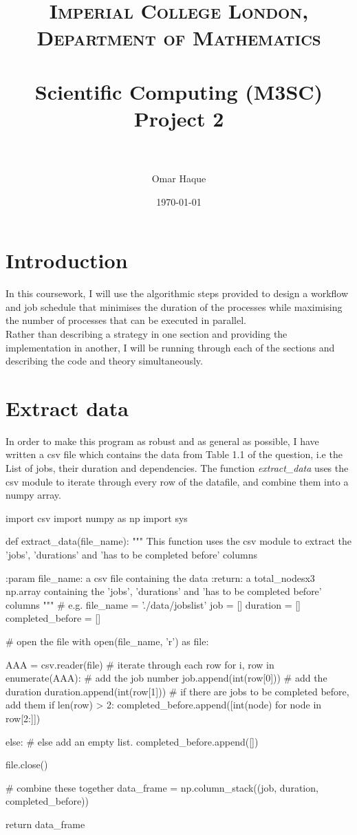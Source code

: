 \documentclass[paper=a4, fontsize=12pt]{scrartcl} %
\title{
\normalfont \normalsize
\textsc{Imperial College London, Department of Mathematics} \\ [25pt]
\horrule{0.5pt} \\[0.4cm]                      %
\huge Scientific Computing (M3SC) Project 2 \\           %
\horrule{2pt} \\[0.5cm]                        %
}
\author{Omar Haque}
\date{\normalsize\today}
\numberwithin{equation}{section}       %
\numberwithin{figure}{section}         %
\numberwithin{table}{section}          %
\begin{document}

\maketitle

\section{Introduction}

In this coursework, I will use the algorithmic steps provided to design a workflow and job schedule that minimises the duration of the processes while maximising the number of processes that can be executed in parallel. \\
Rather than describing a strategy in one section and providing the implementation in another, I will be running through each of the sections and describing the code and theory simultaneously. 
\section{Extract data}
In order to make this program as robust and as general as possible, I have written a csv file which contains the data from Table 1.1 of the question, i.e the List of jobs, their duration and dependencies.
The function \textit{extract\_data} uses the csv module to iterate through every row of the datafile, and combine them into a numpy array.

\begin{python} 
import csv
import numpy as np
import sys


def extract_data(file_name):
    """
    This function uses the csv module to extract the 'jobs', 'durations'
    and 'has to be completed before' columns

    :param file_name: a csv file containing the data
    :return: a total_nodesx3 np.array containing the 'jobs', 'durations'
    and 'has to be completed before' columns
    """
    # e.g. file_name = './data/jobslist'
    job = []
    duration = []
    completed_before = []

    # open the file
    with open(file_name, 'r') as file:

        AAA = csv.reader(file)
        # iterate through each row
        for i, row in enumerate(AAA):
            # add the job number
            job.append(int(row[0]))
            # add the duration
            duration.append(int(row[1]))
            # if there are jobs to be completed before, add them
            if len(row) > 2:
                completed_before.append([int(node) for node in row[2:]])

            else:
                # else add an empty list. 
                completed_before.append([])

    file.close()

    # combine these together
    data_frame = np.column_stack((job, duration, completed_before))

    return data_frame
    \end{python}
\end{document}
